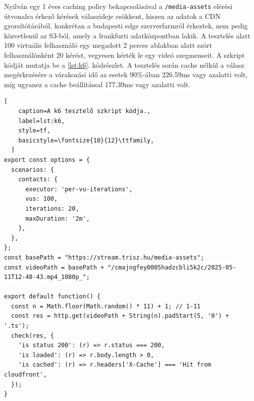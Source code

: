 Nyilván egy 1 éves caching policy bekapcsolásával a \verb|/media-assets| elérési útvonalra érkező kérések válaszideje csökkent, hiszen az adatok a CDN gyorsítótárából, konkrétan a budapesti edge szerverfarmról érkeztek, nem pedig közvetlenül az S3-ból, amely a frankfurti adatközpontban lakik. A tesztelés alatt 100 virtuális felhasználó egy megadott 2 perces ablakban alatt szórt felhasználónként 20 kérést, vegyesen kérték le egy videó szegmenseit. A szkript kódját mutatja be a \ref{lst:k6}. kódrészlet. A tesztelés során cache nélkül a válasz megérkezésére a várakozási idő az esetek 90\%-ában 226.59ms vagy azalatti volt, míg ugyanez a cache beállítással 177.39ms vagy azalatti volt.

\begin{minipage}{0.92\textwidth}
  \begin{lstlisting}[
    caption=A k6 tesztelő szkript kódja.,
    label=lst:k6,
    style=tf,
    basicstyle=\fontsize{10}{12}\ttfamily,
  ]
export const options = {
  scenarios: {
    contacts: {
      executor: 'per-vu-iterations',
      vus: 100,
      iterations: 20,
      maxDuration: '2m',
    },
  },
};
const basePath = "https://stream.trisz.hu/media-assets";
const videoPath = basePath + "/cmajngfey0005hadzcbli5k2c/2025-05-11T12-48-43.mp4_1080p_";

export default function() {
  const n = Math.floor(Math.random() * 11) + 1; // 1-11
  const res = http.get(videoPath + String(n).padStart(5, '0') + '.ts');
  check(res, {
    'is status 200': (r) => r.status === 200,
    'is loaded': (r) => r.body.length > 0,
    'is cached': (r) => r.headers['X-Cache'] === 'Hit from cloudfront',
  });
}  
\end{lstlisting}
\end{minipage}
